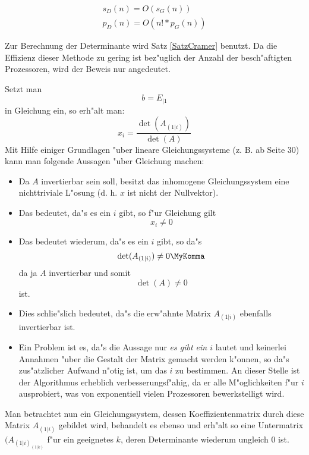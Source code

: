 \begin{satz}
\label{SatzDdurchG}
 
    \begin{eqnarray*}
        s_D(n)= O(s_G(n))
    \\  p_D(n)= O(n! * p_G(n))
    \end{eqnarray*}
\end{satz}
\begin{beweis}
    Zur Berechnung der Determinante wird Satz \ref{SatzCramer} benutzt.
    Da die Effizienz dieser Methode zu gering ist bez"uglich der
    Anzahl der besch"aftigten Prozessoren, wird der Beweis nur
    angedeutet.

    Setzt man \[ b= E_{|1} \] in Gleichung  ein,
    so erh"alt man:
    \begin{equation}
    \label{Equ1SatzDdurchG}
        x_i = \frac{ \det(A_{(1|i)}) }{ \det(A) }
    \end{equation}
    Mit Hilfe einiger Grundlagen "uber lineare Gleichungssysteme
    (z. B. \cite{MM64} ab Seite 30) kann man folgende Aussagen
    "uber Gleichung  machen:
    \begin{itemize}
    \item Da $A$ invertierbar sein soll, besitzt das
          inhomogene Gleichungssystem  eine
          nichttriviale L"osung (d. h. $x$ ist nicht der Nullvektor).
    \item Das bedeutet, da"s es ein $i$ gibt, so f"ur Gleichung
           gilt \[ x_i \neq 0 \]
    \item Das bedeutet wiederum, da"s es ein $i$ gibt, so da"s
          \[ \det(A_{(1|i)}) \neq 0 \MyKomma \]
          da ja $A$ invertierbar und somit
          \[ \det(A) \neq 0 \]
          ist.
    \item Dies schlie"slich bedeutet, da"s die erw"ahnte Matrix
          $A_{(1|i)}$ ebenfalls invertierbar ist.
    \item Ein Problem ist es, da"s die Aussage nur {\em es gibt
          ein $i$} lautet und
          keinerlei Annahmen "uber die Gestalt der Matrix gemacht
          werden k"onnen, so da"s zus"atzlicher Aufwand n"otig ist,
          um das $i$ zu bestimmen. An dieser Stelle ist der Algorithmus
          erheblich verbesserungsf"ahig, da er alle M"oglichkeiten f"ur $i$
          ausprobiert, was von exponentiell vielen Prozessoren
          bewerkstelligt wird.
    \end{itemize}
    Man betrachtet nun ein Gleichungssystem, dessen
    Koeffizientenmatrix durch diese Matrix $A_{(1|i)}$ gebildet wird,
    behandelt es ebenso und erh"alt so eine Untermatrix
    $(A_{ (1|i)_{(1|k)} }$ f"ur ein geeignetes $k$, deren Determinante
    wiederum ungleich $0$ ist.


\end{beweis}
